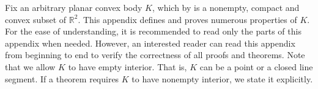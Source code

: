 Fix an arbitrary planar convex body \(K\), which by  is a nonempty, compact and convex subset of \(\mathbb{R}^2\). This appendix defines and proves numerous properties of \(K\). For the ease of understanding, it is recommended to read only the parts of this appendix when needed. However, an interested reader can read this appendix from beginning to end to verify the correctness of all proofs and theorems. Note that we allow \(K\) to have empty interior. That is, \(K\) can be a point or a closed line segment. If a theorem requires \(K\) to have nonempty interior, we state it explicitly.